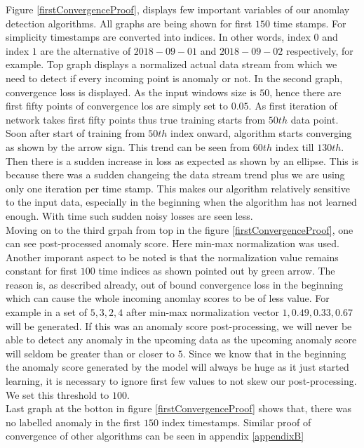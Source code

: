 \documentclass[12pt]{article}
\begin{document}
Figure \ref{firstConvergenceProof}, displays few important variables of our anomlay detection algorithms. All graphs are being shown for first $150$ time stamps. For simplicity timestamps are converted into indices. In other words, index $0$ and index $1$ are the alternative of $2018-09-01$ and $2018-09-02$ respectively, for example. Top graph displays a normalized actual data stream from which we need to detect if every incoming point is anomaly or not. In the second graph, convergence loss is displayed. As the input windows size is $50$, hence there are first fifty points of convergence los are simply set to $0.05$. As first iteration of network takes first fifty points thus true training starts from $50th$ data point. Soon after start of training from $50th$ index onward, algorithm starts converging as shown by the arrow sign. This trend can be seen from $60th$ index till $130th$. Then there is a sudden increase in loss as expected as shown by an ellipse. This is because there was a sudden changeing the data stream trend plus we are using only one iteration per time stamp. This makes our algorithm relatively sensitive to the input data, especially in the beginning when the algorithm has not learned enough. With time such  sudden noisy losses are seen less.\\
\break
Moving on to the third grpah from top in the figure \ref{firstConvergenceProof}, one can see post-processed anomaly score. Here min-max normalization was used. Another imporant aspect to be noted is that the normalization value remains constant for first $100$ time indices as shown pointed out by green arrow. The reason is, as described already, out of bound convergence loss in the beginning which can cause the whole incoming anomlay scores to be of less value. For example in a set of ${5,3,2,4}$ after min-max normalization vector ${1,0.49,0.33,0.67}$ will be generated. If this was an anomaly score post-processing, we will never be able to detect any anomaly in the upcoming data as the upcoming anomaly score will seldom be greater than or closer to $5$. Since we know that in the beginning the anomaly score generated by the model will always be huge as it just started learning, it is necessary to ignore first few values to not skew our post-processing. We set this threshold to $100$.\\
\break
Last graph at the botton in figure \ref{firstConvergenceProof} shows that, there was no labelled anomaly in the first $150$ index timestamps. Similar proof of convergence of other algorithms can be seen in appendix \ref{appendixB}
\newpage
\end{document}
